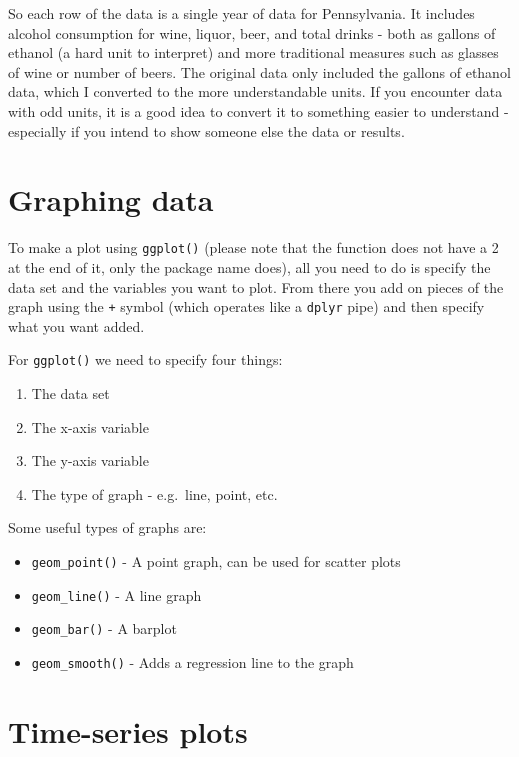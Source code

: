 \documentclass[
]{krantz}
\providecommand{\tightlist}{%
  \setlength{\itemsep}{0pt}\setlength{\parskip}{0pt}}
\begin{document}
So each row of the data is a single year of data for
Pennsylvania. It includes alcohol consumption for wine,
liquor, beer, and total drinks - both as gallons of ethanol
(a hard unit to interpret) and more traditional measures
such as glasses of wine or number of beers. The original
data only included the gallons of ethanol data, which I
converted to the more understandable units. If you encounter
data with odd units, it is a good idea to convert it to
something easier to understand - especially if you intend to
show someone else the data or results.

\hypertarget{graphing-data}{%
\section{Graphing data}\label{graphing-data}}

To make a plot using \texttt{ggplot()} (please note that the
function does not have a 2 at the end of it, only the
package name does), all you need to do is specify the data
set and the variables you want to plot. From there you add
on pieces of the graph using the \texttt{+} symbol (which
operates like a \texttt{dplyr} pipe) and then specify what
you want added.

For \texttt{ggplot()} we need to specify four things:

\begin{enumerate}
\def\labelenumi{\arabic{enumi}.}
\tightlist
\item
  The data set
\item
  The x-axis variable
\item
  The y-axis variable
\item
  The type of graph - e.g.~line, point, etc.
\end{enumerate}

Some useful types of graphs are:

\begin{itemize}
\tightlist
\item
  \texttt{geom\_point()} - A point graph, can be used for
  scatter plots
\item
  \texttt{geom\_line()} - A line graph
\item
  \texttt{geom\_bar()} - A barplot
\item
  \texttt{geom\_smooth()} - Adds a regression line to the
  graph
\end{itemize}

\hypertarget{time-series-plots}{%
\section{Time-series plots}\label{time-series-plots}}
\end{document}
